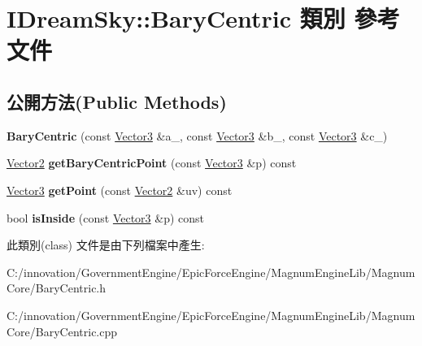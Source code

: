 \hypertarget{class_i_dream_sky_1_1_bary_centric}{}\section{I\+Dream\+Sky\+:\+:Bary\+Centric 類別 參考文件}
\label{class_i_dream_sky_1_1_bary_centric}
\subsection*{公開方法(Public Methods)}
\begin{DoxyCompactItemize}
\item 
{\bfseries Bary\+Centric} (const \hyperlink{class_i_dream_sky_1_1_vector3}{Vector3} \&a\+\_\+, const \hyperlink{class_i_dream_sky_1_1_vector3}{Vector3} \&b\+\_\+, const \hyperlink{class_i_dream_sky_1_1_vector3}{Vector3} \&c\+\_\+)\hypertarget{class_i_dream_sky_1_1_bary_centric_a0b354c28dc3da0b615ffda662e5a4e53}{}\label{class_i_dream_sky_1_1_bary_centric_a0b354c28dc3da0b615ffda662e5a4e53}

\item 
\hyperlink{class_i_dream_sky_1_1_vector2}{Vector2} {\bfseries get\+Bary\+Centric\+Point} (const \hyperlink{class_i_dream_sky_1_1_vector3}{Vector3} \&p) const \hypertarget{class_i_dream_sky_1_1_bary_centric_a4b3084909d9593c059d4e196cc86bc6f}{}\label{class_i_dream_sky_1_1_bary_centric_a4b3084909d9593c059d4e196cc86bc6f}

\item 
\hyperlink{class_i_dream_sky_1_1_vector3}{Vector3} {\bfseries get\+Point} (const \hyperlink{class_i_dream_sky_1_1_vector2}{Vector2} \&uv) const \hypertarget{class_i_dream_sky_1_1_bary_centric_aa27a4543e21dcb66bcb9c06d69ea4c45}{}\label{class_i_dream_sky_1_1_bary_centric_aa27a4543e21dcb66bcb9c06d69ea4c45}

\item 
bool {\bfseries is\+Inside} (const \hyperlink{class_i_dream_sky_1_1_vector3}{Vector3} \&p) const \hypertarget{class_i_dream_sky_1_1_bary_centric_a6f08a57eb77c86561f9a178cd5661692}{}\label{class_i_dream_sky_1_1_bary_centric_a6f08a57eb77c86561f9a178cd5661692}

\end{DoxyCompactItemize}


此類別(class) 文件是由下列檔案中產生\+:\begin{DoxyCompactItemize}
\item 
C\+:/innovation/\+Government\+Engine/\+Epic\+Force\+Engine/\+Magnum\+Engine\+Lib/\+Magnum\+Core/Bary\+Centric.\+h\item 
C\+:/innovation/\+Government\+Engine/\+Epic\+Force\+Engine/\+Magnum\+Engine\+Lib/\+Magnum\+Core/Bary\+Centric.\+cpp\end{DoxyCompactItemize}
